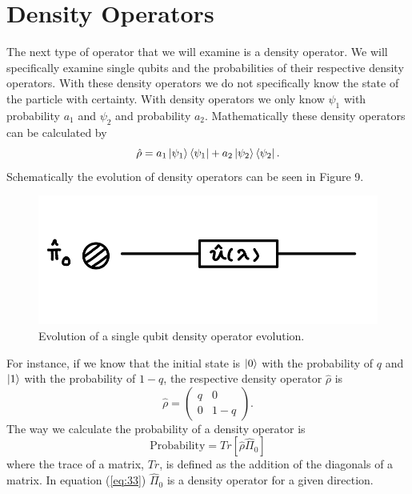 \documentclass[twocolumn]{article}
\begin{document}
\section*{Density Operators}
The next type of operator that we will examine is a density operator. We will specifically examine single qubits and the probabilities of their respective density operators. With these density operators we do not specifically know the state of the particle with certainty. With density operators we only know $\psi_1$ with probability $a_1$ and $\psi_2$ and probability $a_2$. Mathematically these density operators can be calculated by
\begin{equation} \label{eq:31}
\hat{\rho}=a_1\ket{\psi_1}\bra{\psi_1}+a_2\ket{\psi_2}\bra{\psi_2}.
\end{equation}
Schematically the evolution of density operators can be seen in Figure 9.
\begin{figure}[htpb]
\begin{center}
\includegraphics[width=0.90\linewidth]{Density-Operator-Evolution.jpg}
\caption{Evolution of a single qubit density operator evolution.}
\end{center}
\end{figure}
\newline
For instance, if we know that the initial state is $\ket{0}$ with the probability of $q$ and $\ket{1}$ with the probability of $1-q$, the respective density operator $\hat{\rho}$ is
\begin{equation} \label{eq:32}
\hat{\rho}=
\begin{pmatrix}
q & 0 \\
0 & 1-q
\end{pmatrix}.
\end{equation}
The way we calculate the probability of a density operator is
\begin{equation} \label{eq:33}
\text{Probability}=Tr[\hat{\rho}\hat{\Pi}_0]
\end{equation}
where the trace of a matrix, $Tr$, is defined as the addition of the diagonals of a matrix. In equation (\ref{eq:33}) $\hat{\Pi}_0$ is a density operator for a given direction.
\end{document}
